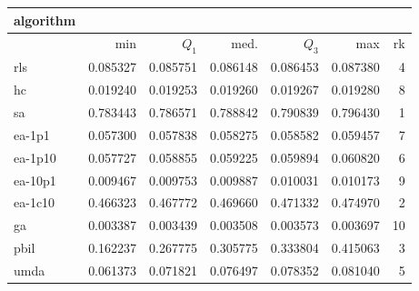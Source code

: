 \begin{tabular}{@{}l*{5}{>{{}}N{1}{3}}>{{}}N{2}{0}@{}}
\toprule
{algorithm} &  \\
\midrule
& {min} & {$Q_1$} & {med.} & {$Q_3$} & {max} & {rk}\\
\midrule
rls & 0.085327 & 0.085751 & 0.086148 & 0.086453 & 0.087380 & 4\\
hc & 0.019240 & 0.019253 & 0.019260 & 0.019267 & 0.019280 & 8\\
sa & {\color{blue}} 0.783443 & {\color{blue}} 0.786571 & {\color{blue}} 0.788842 & {\color{blue}} 0.790839 & {\color{blue}} 0.796430 & 1\\
ea-1p1 & 0.057300 & 0.057838 & 0.058275 & 0.058582 & 0.059457 & 7\\
ea-1p10 & 0.057727 & 0.058855 & 0.059225 & 0.059894 & 0.060820 & 6\\
ea-10p1 & 0.009467 & 0.009753 & 0.009887 & 0.010031 & 0.010173 & 9\\
ea-1c10 & 0.466323 & 0.467772 & 0.469660 & 0.471332 & 0.474970 & 2\\
ga & 0.003387 & 0.003439 & 0.003508 & 0.003573 & 0.003697 & 10\\
pbil & 0.162237 & 0.267775 & 0.305775 & 0.333804 & 0.415063 & 3\\
umda & 0.061373 & 0.071821 & 0.076497 & 0.078352 & 0.081040 & 5\\
\bottomrule
\end{tabular}
